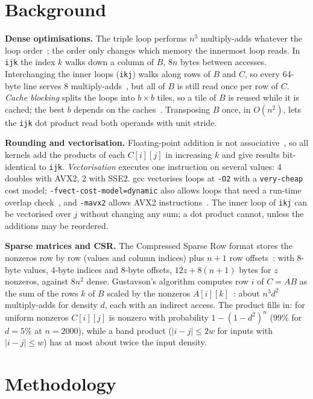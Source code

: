 \documentclass[11pt,a4paper]{article}
\begin{document}
\section{Background}

\textbf{Dense optimisations.} The triple loop performs $n^3$ multiply-adds whatever the loop
order~\cite{cormen2009}; the order only changes which memory the innermost loop reads. In
\texttt{ijk} the index $k$ walks down a column of $B$, $8n$ bytes between accesses.
Interchanging the inner loops (\texttt{ikj}) walks along rows of $B$ and $C$, so every
64-byte line serves 8 multiply-adds~\cite{hennessy2019}, but all of $B$ is still read once
per row of $C$. \textit{Cache blocking} splits the loops into $b \times b$ tiles, so a tile
of $B$ is reused while it is cached; the best $b$ depends on the caches~\cite{lam1991}.
Transposing $B$ once, in $O(n^2)$, lets the \texttt{ijk} dot product read both operands with
unit stride.

\textbf{Rounding and vectorisation.} Floating-point addition is not
associative~\cite{goldberg1991}, so all kernels add the products of each $C[i][j]$ in
increasing $k$ and give results bit-identical to \texttt{ijk}. \textit{Vectorisation}
executes one instruction on several values: 4 doubles with AVX2, 2 with SSE2. gcc vectorises
loops at \texttt{-O2} with a \texttt{very-cheap} cost model;
\texttt{-fvect-cost-model=dynamic} also allows loops that need a run-time overlap
check~\cite{gccopt}, and \texttt{-mavx2} allows AVX2 instructions~\cite{gccx86}. The inner
loop of \texttt{ikj} can be vectorised over $j$ without changing any sum; a dot product
cannot, unless the additions may be reordered.

\textbf{Sparse matrices and CSR.} The Compressed Sparse Row format stores the nonzeros row by
row (values and column indices) plus $n + 1$ row offsets~\cite{saad2003}: with 8-byte
values, 4-byte indices and 8-byte offsets, $12z + 8(n + 1)$ bytes for $z$ nonzeros, against
$8n^2$ dense. Gustavson's algorithm computes row $i$ of $C = AB$ as the sum of the rows $k$
of $B$ scaled by the nonzeros $A[i][k]$~\cite{gustavson1978}: about $n^3 d^2$ multiply-adds
for density $d$, each with an indirect access. The product fills in: for uniform nonzeros
$C[i][j]$ is nonzero with probability $1 - (1 - d^2)^n$ (99\% for $d = 5\%$ at
$n = 2000$), while a band product ($|i - j| \le 2w$ for inputs with $|i - j| \le w$) has at
most about twice the input density.

\section{Methodology}
\end{document}

